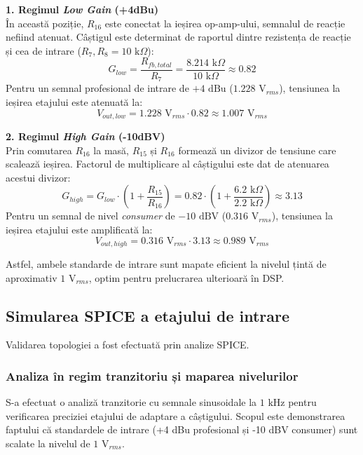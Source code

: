 \textbf{1. Regimul \textit{Low Gain} (+4dBu)} \\
În această poziție, $R_{16}$ este conectat la ieșirea op-amp-ului, semnalul de reacție nefiind atenuat. Câștigul este determinat de raportul dintre rezistența de reacție și cea de intrare ($R_7, R_8 = 10\text{ k}\Omega$):
\begin{equation}
    G_{low} = \frac{R_{fb,total}}{R_{7}} = \frac{8.214\text{ k}\Omega}{10\text{ k}\Omega} \approx 0.82
\end{equation}
Pentru un semnal profesional de intrare de $+4\text{ dBu}$ ($1.228\text{ V}_{rms}$), tensiunea la ieșirea etajului este atenuată la:
\begin{equation}
    V_{out,low} = 1.228\text{ V}_{rms} \cdot 0.82 \approx 1.007\text{ V}_{rms}
\end{equation}

\textbf{2. Regimul \textit{High Gain} (-10dBV)} \\
Prin comutarea $R_{16}$ la masă, $R_{15}$ și $R_{16}$ formează un divizor de tensiune care scalează ieșirea. Factorul de multiplicare al câștigului este dat de atenuarea acestui divizor:
\begin{equation}
    G_{high} = G_{low} \cdot \left( 1 + \frac{R_{15}}{R_{16}} \right) = 0.82 \cdot \left( 1 + \frac{6.2\text{ k}\Omega}{2.2\text{ k}\Omega} \right) \approx 3.13
\end{equation}
Pentru un semnal de nivel \textit{consumer} de $-10\text{ dBV}$ ($0.316\text{ V}_{rms}$), tensiunea la ieșirea etajului este amplificată la:
\begin{equation}
    V_{out,high} = 0.316\text{ V}_{rms} \cdot 3.13 \approx 0.989\text{ V}_{rms}
\end{equation}

Astfel, ambele standarde de intrare sunt mapate eficient la nivelul țintă de aproximativ $1\text{ V}_{rms}$, optim pentru prelucrarea ulterioară în DSP.

\subsection{Simularea SPICE a etajului de intrare}
Validarea topologiei a fost efectuată prin analize SPICE.

\subsubsection{Analiza în regim tranzitoriu și maparea nivelurilor}
S-a efectuat o analiză tranzitorie cu semnale sinusoidale la $1\text{ kHz}$ pentru verificarea preciziei etajului de adaptare a câștigului. Scopul este demonstrarea faptului că standardele de intrare (+4 dBu profesional și -10 dBV consumer) sunt scalate la nivelul de $1\text{ V}_{rms}$.

